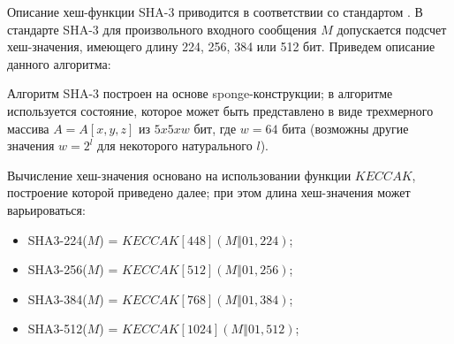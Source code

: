 \documentclass{./civarticle}
\begin{document}
Описание хеш-функции SHA-3 приводится в соответствии со стандартом \cite{sha3}. В стандарте SHA-3 для произвольного входного сообщения $M$ допускается подсчет хеш-значения, имеющего длину 224, 256, 384 или 512 бит. Приведем описание данного алгоритма:

Алгоритм SHA-3 построен на основе sponge-конструкции; в алгоритме используется состояние, которое может быть представлено в виде трехмерного массива $A = A[x, y, z]$ из $5x5xw$ бит, где $w = 64$ бита (возможны другие значения $w = 2^l$ для некоторого натурального $l$).

Вычисление хеш-значения основано на использовании функции $KECCAK$, построение которой приведено далее; при этом длина хеш-значения может варьироваться:
\begin{itemize}
    \item SHA3-224($M$) = $KECCAK[448] (M \mathbin\Vert 01, 224)$;
    \item SHA3-256($M$) = $KECCAK[512] (M \mathbin\Vert 01, 256)$;
    \item SHA3-384($M$) = $KECCAK[768] (M \mathbin\Vert 01, 384)$;
    \item SHA3-512($M$) = $KECCAK[1024] (M \mathbin\Vert 01, 512)$;
\end{itemize}
\end{document}
